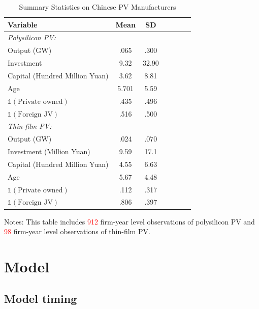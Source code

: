 \documentclass[12pt]{article}
\begin{document}
\begin{table}[!h]
\centering
\caption{Summary Statistics on Chinese PV Manufacturers}
\label{tab:data_sum}
\begin{threeparttable}
\begin{tabularx}{0.7\textwidth}{Xcccccc}
\toprule
Variable & Mean & SD \\
\midrule
\multicolumn{3}{l}{\textit{Polysilicon PV:}} \\
\quad Output (GW) &  .065 & .300 \\
\quad Investment &  9.32 & 32.90 \\
\quad Capital (Hundred Million Yuan) & 3.62  & 8.81 \\
\quad Age & 5.701  & 5.59 \\
\quad $\mathds{1}(\text{Private owned})$ & .435  & .496 \\
\quad $\mathds{1}(\text{Foreign JV})$ & .516 & .500 \\

\multicolumn{3}{l}{\textit{Thin-film PV:}} \\
\quad Output (GW) & .024 & .070\\
\quad Investment (Million Yuan) & 9.59  & 17.1 \\
\quad Capital (Hundred Million Yuan) & 4.55  &6.63  \\
\quad Age &  5.67 & 4.48 \\
\quad $\mathds{1}(\text{Private owned})$ & .112  & .317 \\
\quad $\mathds{1}(\text{Foreign JV})$ & .806  &  .397 \\
\bottomrule
\end{tabularx}
\begin{tablenotes}
  \item  Notes: This table includes \textcolor{red}{912} firm-year level observations of polysilicon PV and \textcolor{red}{98} firm-year level observations of thin-film PV.
\end{tablenotes}
\end{threeparttable}
\end{table}

\section{Model}
\subsection{Model timing}
\end{document}
